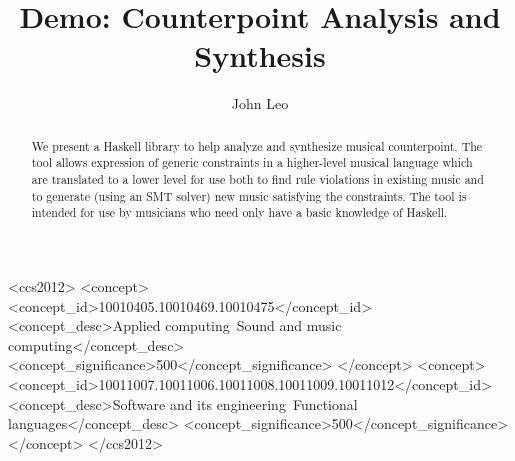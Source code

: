 \documentclass[sigplan,screen]{acmart}
\begin{document}
\title{Demo: Counterpoint Analysis and Synthesis}


\author{John Leo}


\begin{abstract}
We present a Haskell library to help analyze
and synthesize musical counterpoint. The tool allows expression of
generic constraints in a higher-level musical language which are
translated to a lower level for use both to find rule violations in
existing music and to generate (using an SMT solver) new
music satisfying the constraints. The tool is intended for use by
musicians who need only have a basic knowledge of Haskell.
\end{abstract}


\begin{CCSXML}
<ccs2012>
<concept>
<concept_id>10010405.10010469.10010475</concept_id>
<concept_desc>Applied computing~Sound and music computing</concept_desc>
<concept_significance>500</concept_significance>
</concept>
<concept>
<concept_id>10011007.10011006.10011008.10011009.10011012</concept_id>
<concept_desc>Software and its engineering~Functional languages</concept_desc>
<concept_significance>500</concept_significance>
</concept>
</ccs2012>
\end{CCSXML}




\maketitle
\end{document}
